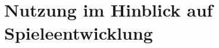 \documentclass[pdf]{beamer}
\begin{document}
	\section{Nutzung im Hinblick auf Spieleentwicklung}
		\subsection{}
			\begin{frame}
			
			\end{frame}
			\begin{frame}
			
			\end{frame}
\end{document}
